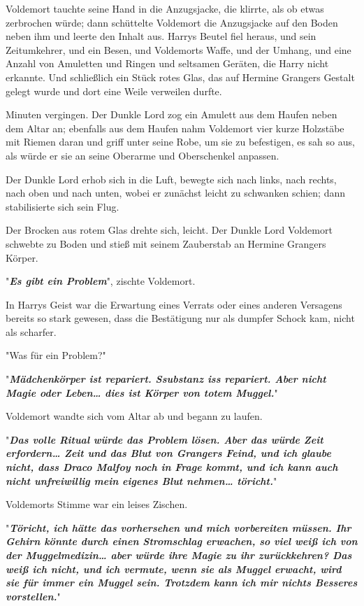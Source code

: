 {Voldemort tauchte seine Hand in die Anzugsjacke, die klirrte, als ob etwas zerbrochen würde; dann schüttelte Voldemort die Anzugsjacke auf den Boden neben ihm und leerte den Inhalt aus. Harrys Beutel fiel heraus, und sein Zeitumkehrer, und ein Besen, und Voldemorts Waffe, und der Umhang, und eine Anzahl von Amuletten und Ringen und seltsamen Geräten, die Harry nicht erkannte. Und schließlich ein Stück rotes Glas, das auf Hermine Grangers Gestalt gelegt wurde und dort eine Weile verweilen durfte.

Minuten vergingen. Der Dunkle Lord zog ein Amulett aus dem Haufen neben dem Altar an; ebenfalls aus dem Haufen nahm Voldemort vier kurze Holzstäbe mit Riemen daran und griff unter seine Robe, um sie zu befestigen, es sah so aus, als würde er sie an seine Oberarme und Oberschenkel anpassen.

Der Dunkle Lord erhob sich in die Luft, bewegte sich nach links, nach rechts, nach oben und nach unten, wobei er zunächst leicht zu schwanken schien; dann stabilisierte sich sein Flug.

Der Brocken aus rotem Glas drehte sich, leicht. Der Dunkle Lord Voldemort schwebte zu Boden und stieß mit seinem Zauberstab an Hermine Grangers Körper.

"\textbf{\emph{Es gibt ein Problem}}", zischte Voldemort.

In Harrys Geist war die Erwartung eines Verrats oder eines anderen Versagens bereits so stark gewesen, dass die Bestätigung nur als dumpfer Schock kam, nicht als scharfer.

"Was für ein Problem?"

"\textbf{\emph{Mädchenkörper ist repariert. Ssubstanz iss repariert. Aber nicht Magie oder Leben… dies ist Körper von totem Muggel.}}"

Voldemort wandte sich vom Altar ab und begann zu laufen.

"\textbf{\emph{Das volle Ritual würde das Problem lösen. Aber das würde Zeit erfordern… Zeit und das Blut von Grangers Feind, und ich glaube nicht, dass Draco Malfoy noch in Frage kommt, und ich kann auch nicht unfreiwillig mein eigenes Blut nehmen… töricht.}}"

Voldemorts Stimme war ein leises Zischen.

"\textbf{\emph{Töricht, ich hätte das vorhersehen und mich vorbereiten müssen. Ihr Gehirn könnte durch einen Stromschlag erwachen, so viel weiß ich von der Muggelmedizin… aber würde ihre Magie zu ihr zurückkehren? Das weiß ich nicht, und ich vermute, wenn sie als Muggel erwacht, wird sie für immer ein Muggel sein. Trotzdem kann ich mir nichts Besseres vorstellen.}}"

}
